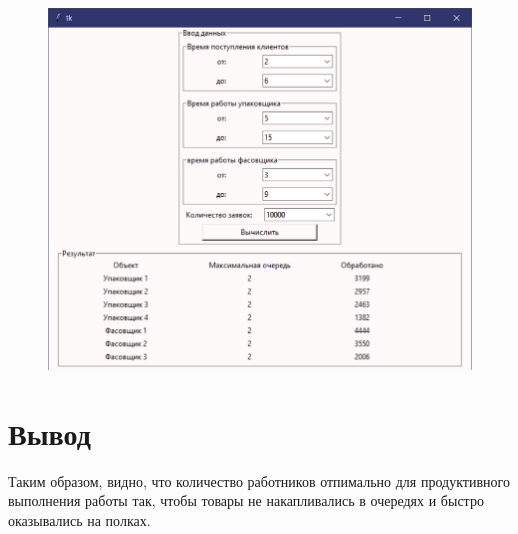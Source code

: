 \documentclass[16pt]{report}
\begin{document}
\begin{figure}[h]
	\centering
	\includegraphics[scale=0.8]{5.jpg}
	\label{fig:screenshot001}
\end{figure}

\chapter*{Вывод}
\begin{doublespace}
{\Large Таким образом, видно, что количество работников отпимально для продуктивного выполнения работы так, чтобы товары не накапливались в очередях и быстро оказывались на полках.}
\end{doublespace}
\end{document}
